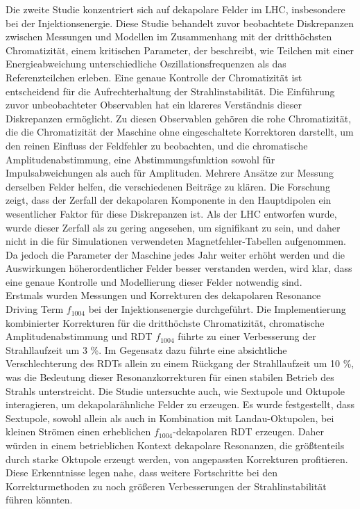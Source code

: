 {%
Die zweite Studie konzentriert sich auf dekapolare Felder im LHC, insbesondere bei der
Injektionsenergie. Diese Studie behandelt zuvor beobachtete Diskrepanzen zwischen Messungen und
Modellen im Zusammenhang mit der dritthöchsten Chromatizität, einem kritischen Parameter, der
beschreibt, wie Teilchen mit einer Energieabweichung unterschiedliche Oszillationsfrequenzen als das
Referenzteilchen erleben. Eine genaue Kontrolle der Chromatizität ist entscheidend für die
Aufrechterhaltung der Strahlinstabilität. Die Einführung zuvor unbeobachteter Observablen hat ein
klareres Verständnis dieser Diskrepanzen ermöglicht. Zu diesen Observablen gehören die rohe
Chromatizität, die die Chromatizität der Maschine ohne eingeschaltete Korrektoren darstellt, um den
reinen Einfluss der Feldfehler zu beobachten, und die chromatische Amplitudenabstimmung, eine
Abstimmungsfunktion sowohl für Impulsabweichungen als auch für Amplituden. Mehrere Ansätze zur
Messung derselben Felder helfen, die verschiedenen Beiträge zu klären. Die Forschung zeigt, dass der
Zerfall der dekapolaren Komponente in den Hauptdipolen ein wesentlicher Faktor für diese
Diskrepanzen ist. Als der LHC entworfen wurde, wurde dieser Zerfall als zu gering angesehen, um
signifikant zu sein, und daher nicht in die für Simulationen verwendeten Magnetfehler-Tabellen
aufgenommen. Da jedoch die Parameter der Maschine jedes Jahr weiter erhöht werden und die
Auswirkungen höherordentlicher Felder besser verstanden werden, wird klar, dass eine genaue
Kontrolle und Modellierung dieser Felder notwendig sind.\\
\indent
Erstmals wurden Messungen und Korrekturen des dekapolaren Resonance Driving Term $f_{1004}$ bei der
Injektionsenergie durchgeführt. Die Implementierung kombinierter Korrekturen für die dritthöchste
Chromatizität, chromatische Amplitudenabstimmung und RDT $f_{1004}$ führte zu einer Verbesserung der
Strahllaufzeit um 3 \%. Im Gegensatz dazu führte eine absichtliche Verschlechterung des RDTs allein
zu einem Rückgang der Strahllaufzeit um 10 \%, was die Bedeutung dieser Resonanzkorrekturen für einen
stabilen Betrieb des Strahls unterstreicht. Die Studie untersuchte auch, wie Sextupole und Oktupole
interagieren, um dekapolarähnliche Felder zu erzeugen. Es wurde festgestellt, dass Sextupole, sowohl
allein als auch in Kombination mit Landau-Oktupolen, bei kleinen Strömen einen erheblichen
$f_{1004}$-dekapolaren RDT erzeugen. Daher würden in einem betrieblichen Kontext dekapolare
Resonanzen, die größtenteils durch starke Oktupole erzeugt werden, von angepassten Korrekturen
profitieren. Diese Erkenntnisse legen nahe, dass weitere Fortschritte bei den Korrekturmethoden zu
noch größeren Verbesserungen der Strahlinstabilität führen könnten.

}
